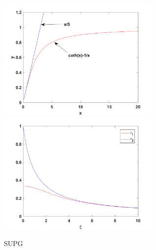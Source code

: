 \documentclass[10pt,a4paper]{book}
\begin{document}
\begin{figure}
\includegraphics[width=8cm]{SUPG-curves.png}
\includegraphics[width=8cm]{tau1tau2.png}
\caption{SUPG}
\label{fig:SUPG}
\end{figure}
\end{document}
